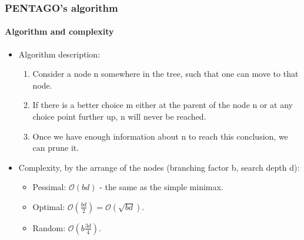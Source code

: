 \documentclass[10pt]{beamer}
\begin{document}
\begin{frame}
\frametitle{PENTAGO's algorithm}
\framesubtitle{Algorithm and complexity}

	\begin{itemize}
	  
		\item  Algorithm description:
		
			\begin{enumerate}
			  \item Consider a node n somewhere in the tree, such that one can move to
			  that node.
			  \item If there is a better choice m either at the parent of the node n or
			  at any choice point further up, n will never be reached.
			  \item Once we have enough information about n to reach this conclusion, we
			  can prune it.
			\end{enumerate}
			
		\item Complexity, by the arrange of the nodes (branching factor b, search
		depth d):
		
			\begin{itemize}
			  
			  \item Pessimal: \(\mathcal{O}(bd)\) - the same as the simple minimax.
			  \item Optimal: \(\mathcal{O} (\frac{bd}{2}) = \mathcal{O}( \sqrt {bd} ) \).
			  \item Random: \(\mathcal{O} ( b\frac{3d}{4})\).

			\end{itemize}
				
	\end{itemize}
\end{frame}
\end{document}
